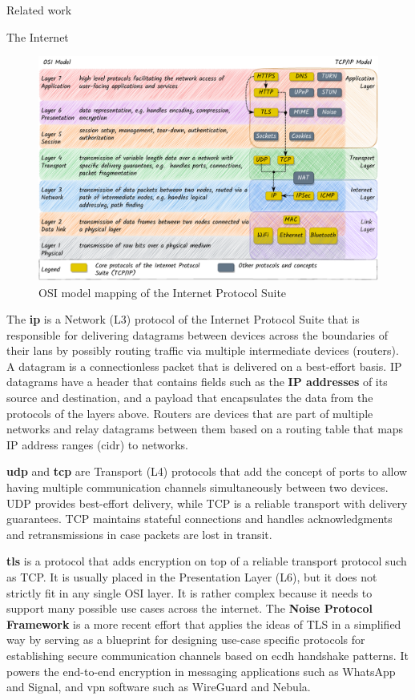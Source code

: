 \begin{frame}[fragile]{Related work}
\begin{block}{The Internet}
\begin{figure}
\centering
\includegraphics[width=1\textwidth,height=\textheight]{thesis/../figures/osi-map-tcp.drawio.pdf}
\caption{OSI model mapping of the Internet Protocol
Suite\label{osi-map-tcp}}
\end{figure}

The \textbf{\acrfull{ip}} is a Network (L3) protocol of the Internet
Protocol Suite that is responsible for delivering datagrams between
devices across the boundaries of their \glspl{lan} by possibly routing
traffic via multiple intermediate devices (routers). A datagram is a
connectionless packet that is delivered on a best-effort basis. IP
datagrams have a header that contains fields such as the \textbf{IP
addresses} of its source and destination, and a
payload that encapsulates the data from the protocols of the layers
above. Routers are devices that are part of multiple networks and relay
datagrams between them based on a routing table that maps IP address
ranges (\gls{cidr}) to networks.

\textbf{\acrfull{udp}} and \textbf{\acrfull{tcp}} are Transport (L4)
protocols that add the concept of ports to allow having multiple
communication channels simultaneously between two devices. UDP provides
best-effort delivery, while TCP is a reliable transport with delivery
guarantees. TCP maintains stateful connections and handles
acknowledgments and retransmissions in case packets are lost in transit.

\textbf{\acrfull{tls}} is a protocol that adds encryption on top of a
reliable transport protocol such as TCP. It is usually placed in the
Presentation Layer (L6), but it does not strictly fit in any single OSI
layer. It is rather complex because it needs to support many possible
use cases across the internet.  The \textbf{Noise Protocol
Framework} \autocite{noiseDocs} is a more
 recent effort that applies the
ideas of TLS in a simplified way by serving as a blueprint for designing
use-case specific protocols for establishing secure communication
channels based on \gls{ecdh} handshake patterns. It powers the
end-to-end encryption in messaging applications such as WhatsApp and
Signal, and \gls{vpn} software such as WireGuard and Nebula.


\end{block}
\end{frame}
